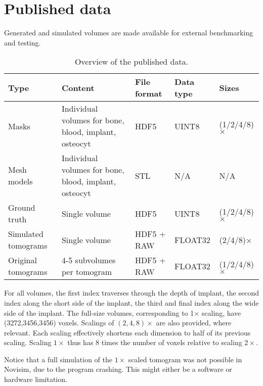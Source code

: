 \section{Published data}
\label{sec:pubdata}

Generated and simulated volumes are made available for external benchmarking and testing.

\begin{table*}
    \caption{Overview of the published data.}
    \label{tab:pubdata}
    \centering
    \begin{tabular}{@{}p{2cm}p{5cm}p{2.5cm}p{2.5cm}p{2.5cm}@{}}
    \toprule
	    \textbf{Type} & \textbf{Content} & \textbf{File format} & \textbf{Data type} & \textbf{Sizes} \\
    \midrule
	    Masks & Individual volumes for bone, blood, implant, osteocyt & HDF5 & UINT8 & (1/2/4/8)$\times$ \\
	    Mesh models & Individual volumes for bone, blood, implant, osteocyt & STL & N/A & N/A \\
	    Ground truth & Single volume & HDF5 & UINT8 & (1/2/4/8)$\times$ \\
	    Simulated tomograms & Single volume & HDF5 + RAW & FLOAT32 & (2/4/8)$\times$ \\
	    Original tomograms & 4-5 subvolumes per tomogram & HDF5 + RAW & FLOAT32 & (1/2/4/8)$\times$ \\
    \bottomrule
    \end{tabular}
\end{table*}

For all volumes, the first index traverses through the depth of implant, the second index along the short side of the implant, the third and final index along the wide side of the implant. The full-size volumes, corresponding to 1$\times$ scaling, have (3272,3456,3456) voxels. Scalings of $(2,4,8)\times$ are also provided, where relevant. Each scaling effectively shortens each dimension to half of its previous scaling. Scaling $1\times$ thus has 8 times the number of voxels relative to scaling $2\times$.

Notice that a full simulation of the $1\times$ scaled tomogram was not possible in Novisim, due to the program crashing. This might either be a software or hardware limitation.


